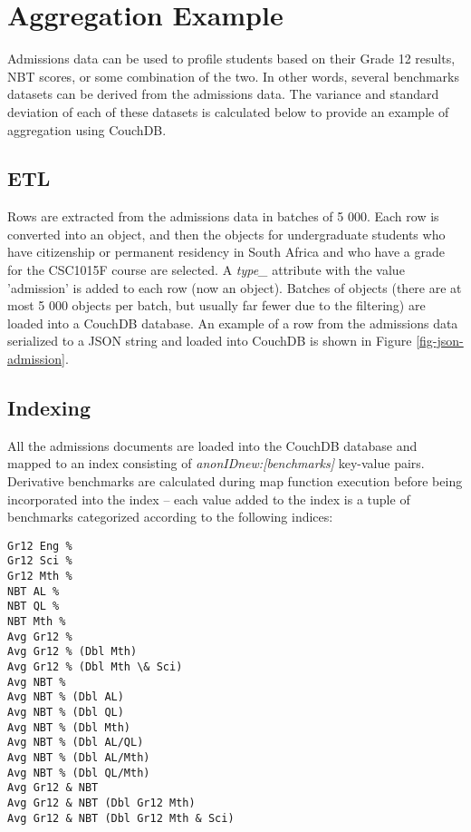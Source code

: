 \section{Aggregation Example}
\label{aggregation}
Admissions data can be used to profile students based on their Grade 12 results, NBT scores, or some combination of the two. In other words, several benchmarks datasets can be derived from the admissions data. The variance and standard deviation of each of these datasets is calculated below to provide an example of aggregation using CouchDB.

\subsection{ETL}
Rows are extracted from the admissions data in batches of 5 000. Each row is converted into an object, and then the objects for undergraduate students who have citizenship or permanent residency in South Africa and who have a grade for the CSC1015F course are selected. A \textit{type\_} attribute with the value 'admission' is added to each row (now an object). Batches of objects (there are at most 5 000 objects per batch, but usually far fewer due to the filtering) are loaded into a CouchDB database. An example of a row from the admissions data serialized to a JSON string and loaded into CouchDB is shown in Figure \ref{fig-json-admission}.



\subsection{Indexing}
All the admissions documents are loaded into the CouchDB database and mapped to an index consisting of \textit{anonIDnew:[benchmarks]} key-value pairs. Derivative benchmarks are calculated during map function execution before being incorporated into the index – each value added to the index is a tuple of benchmarks categorized according to the following indices:

\begin{verbatim}
Gr12 Eng % 
Gr12 Sci % 
Gr12 Mth % 
NBT AL % 
NBT QL % 
NBT Mth % 
Avg Gr12 % 
Avg Gr12 % (Dbl Mth)
Avg Gr12 % (Dbl Mth \& Sci)
Avg NBT % 
Avg NBT % (Dbl AL)
Avg NBT % (Dbl QL)
Avg NBT % (Dbl Mth)
Avg NBT % (Dbl AL/QL)
Avg NBT % (Dbl AL/Mth)
Avg NBT % (Dbl QL/Mth)
Avg Gr12 & NBT 
Avg Gr12 & NBT (Dbl Gr12 Mth)
Avg Gr12 & NBT (Dbl Gr12 Mth & Sci)
\end{verbatim}

